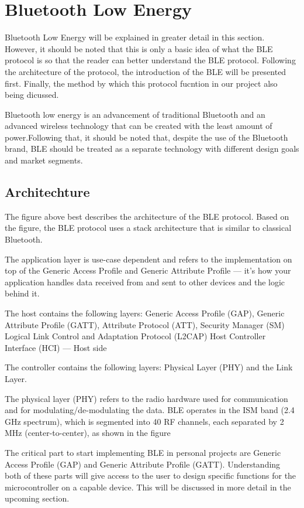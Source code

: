 \section{Bluetooth Low Energy}

Bluetooth Low Energy will be explained in greater detail in this section. However, it should be noted that this is only a basic idea of what the BLE protocol is so that the reader can better understand the BLE protocol. Following the architecture of the protocol, the introduction of the BLE will be presented first. Finally, the method by which this protocol fucntion in our project also being dicussed.

Bluetooth low energy is an advancement of traditional Bluetooth and an advanced wireless technology that can be created with the least amount of power.Following that, it should be noted that, despite the use of the Bluetooth brand, BLE should be treated as a separate technology with different design goals and market segments.



\subsection{Architechture}

The figure above best describes the architecture of the BLE protocol. Based on the figure, the BLE protocol uses a stack architecture that is similar to classical Bluetooth. 

The application layer is use-case dependent and refers to the implementation on top of the Generic Access Profile and Generic Attribute Profile — it’s how your application handles data received from and sent to other devices and the logic behind it.

The host contains the following layers: Generic Access Profile (GAP), Generic Attribute Profile (GATT), Attribute Protocol (ATT), Security Manager (SM) Logical Link Control and Adaptation Protocol (L2CAP) Host Controller Interface (HCI) — Host side

The controller contains the following layers: Physical Layer (PHY) and the Link Layer.

The physical layer (PHY) refers to the radio hardware used for communication and for modulating/de-modulating the data. BLE operates in the ISM band (2.4 GHz spectrum), which is segmented into 40 RF channels, each separated by 2 MHz (center-to-center), as shown in the figure

The critical part to start implementing BLE in personal projects are Generic Access Profile (GAP) and Generic Attribute Profile (GATT). Understanding both of these parts will give access to the user to design specific functions for the microcontroller on a capable device. This will be discussed in more detail in the upcoming section.


